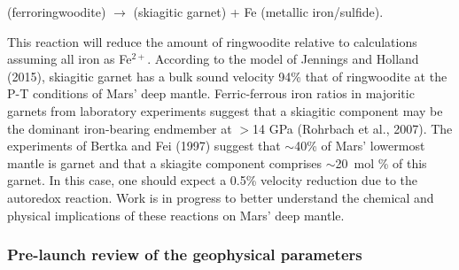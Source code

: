  (ferroringwoodite) $\rightarrow$  (skiagitic garnet) + Fe (metallic iron/sulfide).

This reaction will reduce the amount of ringwoodite relative to calculations assuming all iron as Fe$^{2+}$. According to the model of Jennings and Holland (2015), skiagitic garnet has a bulk sound velocity 94\% that of ringwoodite at the P-T conditions of Mars' deep mantle. Ferric-ferrous iron ratios in majoritic garnets from laboratory experiments suggest that a skiagitic component may be the dominant iron-bearing endmember at $>$14 GPa (Rohrbach et al., 2007). The experiments of Bertka and Fei (1997) suggest that $\sim$40\% of Mars' lowermost mantle is garnet and that a skiagite component comprises $\sim$20\ mol \% of this garnet. In this case, one should expect a 0.5\% velocity reduction due to the autoredox reaction. Work is in progress to better understand the chemical and physical implications of these reactions on Mars' deep mantle.

\subsubsection{Pre-launch review of the geophysical parameters}
\label{sec:geophys}
